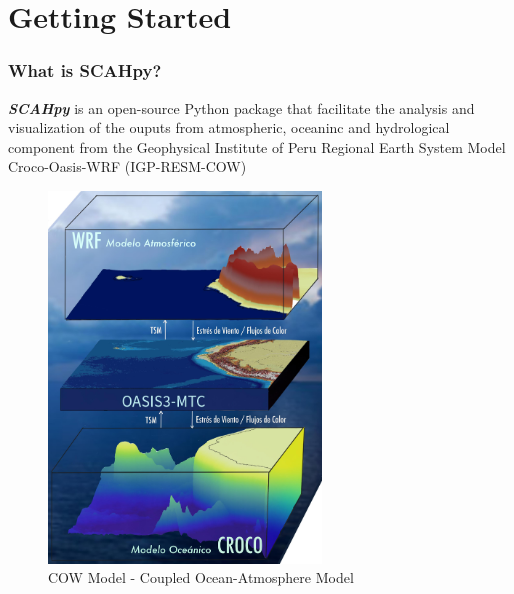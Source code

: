 \documentclass[
  letterpaper,
  DIV=11,
  numbers=noendperiod]{scrreprt}
\author{Fiorela Castillón}
\date{2023-12-11}
\renewcommand*\contentsname{Table of contents}
\newcommand\contentsname{Table of contents}
\begin{document}
\ifdefined\Shaded\renewenvironment{Shaded}{\begin{tcolorbox}[breakable, interior hidden, enhanced, frame hidden, borderline west={3pt}{0pt}{shadecolor}, sharp corners, boxrule=0pt]}{\end{tcolorbox}}\fi

\renewcommand*\contentsname{Table of contents}
{
\hypersetup{linkcolor=}
\setcounter{tocdepth}{2}
\tableofcontents
}
\part{Getting Started}

\hypertarget{what-is-scahpy}{%
\section*{\texorpdfstring{\textbf{What is
SCAHpy?}}{What is SCAHpy?}}\label{what-is-scahpy}}


\textbf{\emph{SCAHpy}} is an open-source Python package that facilitate
the analysis and visualization of the ouputs from atmospheric, oceaninc
and hydrological component from the Geophysical Institute of Peru
Regional Earth System Model Croco-Oasis-WRF (IGP-RESM-COW)

\begin{figure}

{\centering \includegraphics[width=2.85417in,height=\textheight]{cow_model.jpg}

}

\caption{COW Model - Coupled Ocean-Atmosphere Model}

\end{figure}
\end{document}
